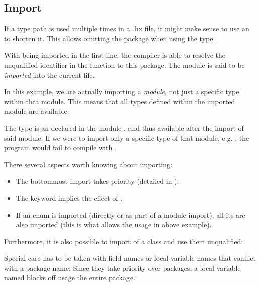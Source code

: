 \documentclass{haxe}
\begin{document}
\subsection{Import}
\label{type-system-import}

If a type path is used multiple times in a .hx file, it might make sense to use an  to shorten it. This allows omitting the package when using the type:


With  being imported in the first line, the compiler is able to resolve the unqualified identifier  in the  function to this package. The module  is said to be \emph{imported} into the current file.

In this example, we are actually importing a \emph{module}, not just a specific type within that module. This means that all types defined within the imported module are available:


The type  is an  declared in the module , and thus available after the import of said module. If we were to import only a specific type of that module, e.g. , the program would fail to compile with .

There several aspects worth knowing about importing:

\begin{itemize}
	\item The bottommost import takes priority (detailed in ).
	\item The  keyword  implies the effect of .
	\item If an enum is imported (directly or as part of a module import), all its  are also imported (this is what allows the  usage in above example).
\end{itemize}

Furthermore, it is also possible to import  of a class and use them unqualified:



Special care has to be taken with field names or local variable names that conflict with a package name: Since they take priority over packages, a local variable named  blocks off usage the entire  package.
\end{document}
